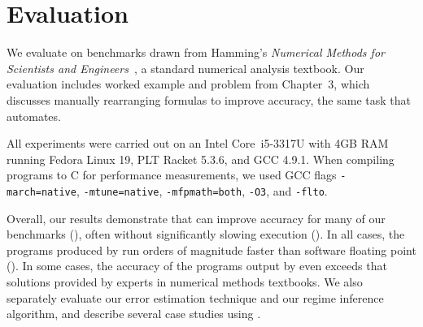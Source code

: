 \documentclass[paper.tex]{subfiles}
\begin{document}
\section{Evaluation}
\label{sec:evaluation}

We evaluate \casio on benchmarks drawn from Hamming's \emph{Numerical
  Methods for Scientists and Engineers}~\cite{book87-nmse}, a standard
numerical analysis textbook.  Our evaluation includes
 worked example and
problem from Chapter~3,
which discusses manually rearranging formulas to improve accuracy, the
same task that \casio automates.

All experiments were carried out on an Intel Core~i5-3317U with 4GB
RAM running Fedora Linux 19, PLT Racket 5.3.6, and GCC 4.9.1.  When
compiling programs to C for performance measurements, we used GCC
flags \texttt{-march=native}, \texttt{-mtune=native},
\texttt{-mfpmath=both}, \texttt{-O3}, and \texttt{-flto}.

Overall, our results demonstrate that \casio can improve accuracy for
many of our benchmarks (), often
without significantly slowing execution ().  In all cases, the programs produced by \casio run orders of
magnitude faster than software floating point ().  In some cases, the accuracy of the programs output
by \casio even exceeds that solutions provided by experts in numerical
methods textbooks.  We also separately evaluate our error estimation
technique and our regime inference algorithm, and describe several
case studies using \casio.
\end{document}
